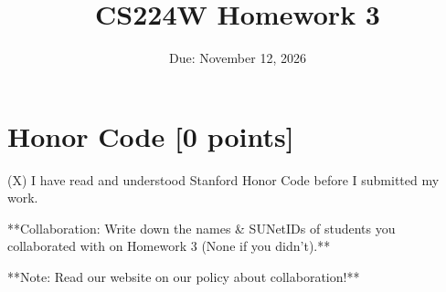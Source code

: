 
\usepackage{array}
\usepackage{booktabs}
\graphicspath{{assets}{Homework 3/assets/}}


\title{CS224W Homework 3}
\date{Due: November 12, 2026}



\maketitle








\section{Honor Code [0 points]}
(X) I have read and understood Stanford Honor Code before I submitted my
work.

**Collaboration: Write down the names \& SUNetIDs of students you collaborated with on Homework 3 (None if you didn’t).**

**Note: Read our website on our policy about collaboration!**


